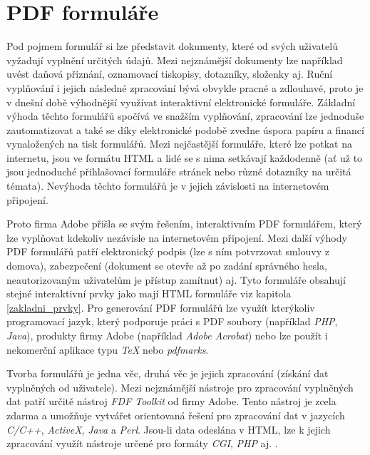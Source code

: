 \section{PDF formuláře}
Pod pojmem formulář si lze představit dokumenty, které od svých uživatelů vyžadují vyplnění určitých údajů. Mezi nejznámější dokumenty lze například uvést daňová přiznání, oznamovací tiskopisy, dotazníky, složenky aj. Ruční vyplňování i jejich následné zpracování bývá obvykle pracné a zdlouhavé, proto je v dnešní době výhodnější využívat interaktivní elektronické formuláře. Základní výhoda těchto formulářů spočívá ve snažším vyplňování, zpracování lze jednoduše zautomatizovat a také se díky elektronické podobě zvedne úspora papíru a financí vynaložených na tisk formulářů.  Mezi nejčastější formuláře, které lze potkat na internetu, jsou ve formátu HTML a lidé se s nima setkávají každodenně (ať už to jsou jednoduché přihlašovací formuláře stránek nebo různé dotazníky na určitá témata). Nevýhoda těchto formulářů je v jejich závislosti na internetovém připojení. 
\par
Proto firma Adobe přišla se svým řešením, interaktivním PDF formulářem, který lze vyplňovat kdekoliv nezávisle na internetovém připojení. Mezi další výhody PDF formulářů patří elektronický podpis (lze s ním potvrzovat smlouvy z domova), zabezpečení (dokument se otevře až po zadání správného hesla, neautorizovaným uživatelům je přístup zamítnut) aj. Tyto formuláře obsahují stejné interaktivní prvky jako mají HTML formuláře viz kapitola \ref{zakladni_prvky}. Pro generování PDF formulářů lze využít kterýkoliv programovací jazyk, který podporuje práci s PDF soubory (například \textit{PHP}, \textit{Java}), produkty firmy Adobe (například \textit{Adobe Acrobat}) nebo lze použít i nekomerční aplikace typu \textit{TeX} nebo \textit{pdfmarks}.
\par
Tvorba formulářů je jedna věc, druhá věc je jejich zpracování (získání dat vyplněných od uživatele). Mezi nejznámější nástroje pro zpracování vyplněných dat patří určitě nástroj \textit{FDF Toolkit} od firmy Adobe. Tento nástroj je zcela zdarma a umožňuje vytvářet orientovaná řešení pro zpracování dat v jazycích \textit{C/C++}, \textit{ActiveX}, \textit{Java} a \textit{Perl}. Jsou-li data odeslána v HTML, lze k jejich zpracování využít nástroje určené pro formáty \textit{CGI}, \textit{PHP} aj. \cite{PDFForm}.
